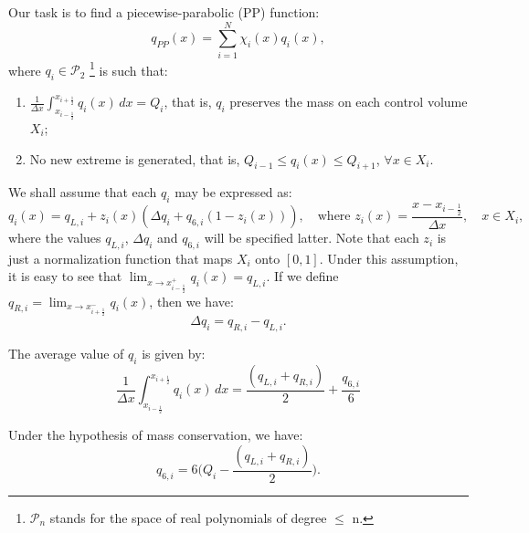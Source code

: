 Our task is to find a piecewise-parabolic (PP) 
function:
\begin{equation}
	\label{chp1-sec3-1-eq2}
	q_{PP}(x) = \sum_{i=1}^{N} \chi_i(x) q_i(x),
\end{equation}
where ${q}_i \in \mathcal{P}_2$
\footnote{$\mathcal{P}_n$ stands for the space of real polynomials of degree $\leq$ n.} 
is such that:
\begin{enumerate}
	\item $\frac{1}{\Delta x}\int_{x_{i-\frac{1}{2}}}^{x_{i+\frac{1}{2}}} {q}_i(x) \,dx = {Q}_i$,
	that is, $q_i$ preserves the mass on each control volume $X_i$;
	\item No new extreme is generated, that is, 
	${Q}_{i-1} \leq q_i(x) \leq {Q}_{i+1}$, $\forall x \in X_i$.
\end{enumerate}

We shall assume that each $q_i$ may be expressed as:
\begin{equation}
	q_i(x) = q_{L, i} + z_i(x)(\Delta q_i + q_{6, i}(1-z_i(x))), 
	\quad \text{where }
	z_i(x) = \frac{x-x_{i-\frac{1}{2}}}{\Delta x},
	\quad x \in X_i,
\end{equation}
where the values $q_{L, i}$, $\Delta q_i$ and $q_{6, i}$  will be specified latter.
Note that each $z_i$ is just a normalization function that maps $X_i$ onto $[0,1]$.
Under this assumption, it is easy to see that 
$\lim_{x \to x_{i-\frac{1}{2}}^+} {q_i(x)} = q_{L, i}$.
If we define $q_{R, i} = \lim_{x \to x_{i+\frac{1}{2}}^-} {q_i(x)}$,
then we have:
\begin{equation}
	\label{chp1-sec3-1-eq3}
	\Delta q_i = q_{R, i} - q_{L, i}.
\end{equation}

The average value of $q_i$ is given by:
\begin{equation}
	\label{chp1-sec3-1-eq4}
	\frac{1}{\Delta x}\int_{x_{i-\frac{1}{2}}}^{x_{i+\frac{1}{2}}} {q}_i(x) \,dx
	= \frac{(q_{L,i} + q_{R,i})}{2} + \frac{q_{6,i}}{6}
\end{equation}

Under the hypothesis of mass conservation, we have:
\begin{equation}
        \label{chp1-sec3-1-eq5}
	q_{6,i} = 6\bigg(Q_i - \frac{(q_{L,i} + q_{R,i})}{2}\bigg).
\end{equation}

